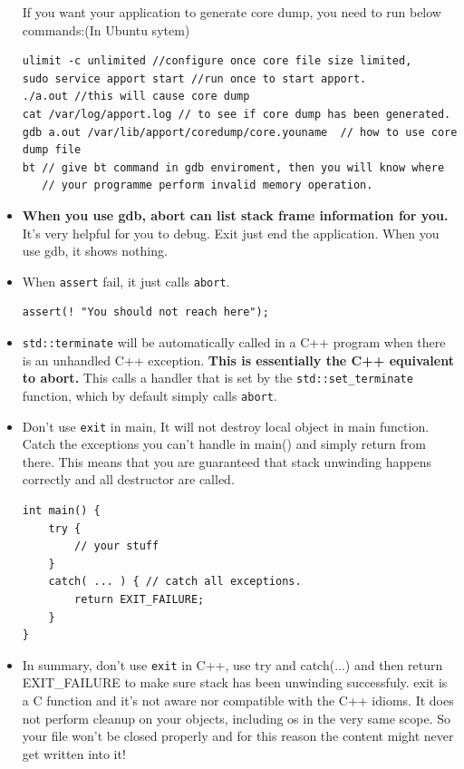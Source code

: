 \documentclass[a4paper,11pt,twoside]{book}
\begin{document}
\begin{itemize}
If you want your application to generate core dump, you need to run below commands:(In Ubuntu sytem)
\begin{lstlisting}[]
ulimit -c unlimited //configure once core file size limited,
sudo service apport start //run once to start apport.
./a.out //this will cause core dump
cat /var/log/apport.log // to see if core dump has been generated. 
gdb a.out /var/lib/apport/coredump/core.youname  // how to use core dump file
bt // give bt command in gdb enviroment, then you will know where 
   // your programme perform invalid memory operation.
\end{lstlisting}
	
	\item \textbf{When you use gdb, abort can list stack frame information for you.} It's very helpful for you to debug.  Exit just end the application. When you use gdb, it shows nothing.
	
	\item When \texttt{assert} fail, it just calls \texttt{abort}. 
\begin{lstlisting}[numbers=none]
assert(! "You should not reach here");
\end{lstlisting}
	
	\item \texttt{std::terminate} will be automatically called in a C++ program when there is an unhandled C++ exception. \textbf{This is essentially the C++ equivalent to abort.} This calls a handler that is set by the \texttt{std::set\_terminate} function, which by default simply calls \texttt{abort}.
	
	\item Don't use \texttt{exit} in main, It will not destroy local object in main function. Catch the exceptions you can't handle in main() and simply return from there. This means that you are guaranteed that stack unwinding happens correctly and all destructor are called.
\begin{lstlisting}[numbers=none]
int main() {
	try {
		// your stuff
	}
	catch( ... ) { // catch all exceptions.
		return EXIT_FAILURE;
	}
}
\end{lstlisting}
	
	

    \item In summary, don't use \texttt{exit} in C++, use try and catch(...) and then return EXIT\_FAILURE to make sure stack has been unwinding successfuly.  exit is a C function and it's not aware nor compatible with the C++ idioms. It does not perform cleanup on your objects, including os in the very same scope. So your file won't be closed properly and for this reason the content might never get written into it!   


\end{itemize}
\end{document}
